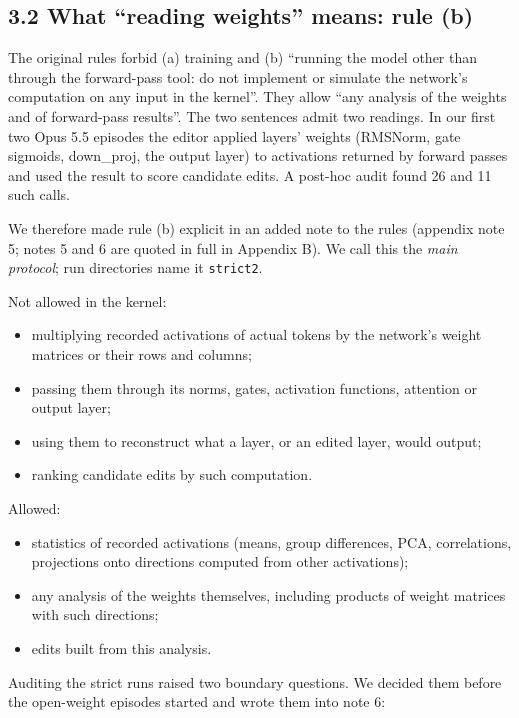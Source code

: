 \documentclass[
  10pt,
]{article}
\newcommand{\passthrough}[1]{#1}
\providecommand{\tightlist}{%
  \setlength{\itemsep}{0pt}\setlength{\parskip}{0pt}}
\begin{document}
\subsection{3.2 What ``reading weights'' means: rule
(b)}\label{what-reading-weights-means-rule-b}

The original rules forbid (a) training and (b) ``running the model other
than through the forward-pass tool: do not implement or simulate the
network's computation on any input in the kernel''. They allow ``any
analysis of the weights and of forward-pass results''. The two sentences
admit two readings. In our first two Opus 5.5 episodes the editor
applied layers' weights (RMSNorm, gate sigmoids, down\_proj, the output
layer) to activations returned by forward passes and used the result to
score candidate edits. A post-hoc audit found 26 and 11 such calls.

We therefore made rule (b) explicit in an added note to the rules
(appendix note 5; notes 5 and 6 are quoted in full in Appendix B). We
call this the \emph{main protocol}; run directories name it
\passthrough{\lstinline!strict2!}.

Not allowed in the kernel:

\begin{itemize}
\tightlist
\item
  multiplying recorded activations of actual tokens by the network's
  weight matrices or their rows and columns;
\item
  passing them through its norms, gates, activation functions, attention
  or output layer;
\item
  using them to reconstruct what a layer, or an edited layer, would
  output;
\item
  ranking candidate edits by such computation.
\end{itemize}

Allowed:

\begin{itemize}
\tightlist
\item
  statistics of recorded activations (means, group differences, PCA,
  correlations, projections onto directions computed from other
  activations);
\item
  any analysis of the weights themselves, including products of weight
  matrices with such directions;
\item
  edits built from this analysis.
\end{itemize}

Auditing the strict runs raised two boundary questions. We decided them
before the open-weight episodes started and wrote them into note 6:
\end{document}
